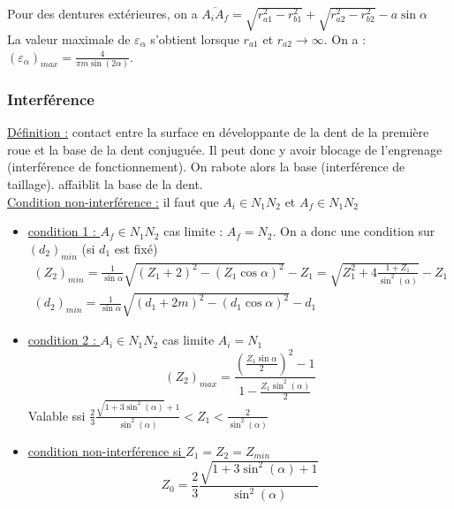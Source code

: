 \documentclass[../main.tex]{subfiles}
\begin{document}
Pour des dentures extérieures, on a $\overline{A_iA_f} = \sqrt{r_{a1}^2-r_{b1}^2}+\sqrt{r_{a2}^2-r_{b2}^2}-a\sin{\alpha}$\\

La valeur maximale de $\varepsilon_\alpha$ s'obtient lorsque $r_{a1}$ et $r_{a2}\rightarrow \infty$. On a : $(\varepsilon_\alpha)_{max} = \frac{4}{\pi m \sin(2\alpha)}$.

\subsubsection{Interférence}
\quad \underline{Définition :} contact entre la surface en développante de la dent de la première roue et la base de la dent conjuguée. Il peut donc y avoir blocage de l'engrenage (interférence de fonctionnement). On rabote alors la base (interférence de taillage). \warning affaiblit la base de la dent.\\

\quad \underline{Condition non-interférence :} il faut que $A_i \in N_1N_2$ et $A_f \in N_1N_2$\\

\begin{itemize}
    \item \underline{condition 1 : $A_f \in N_1N_2$} cas limite : $A_f=N_2$. On a donc une condition sur $(d_2)_{min}$ (si $d_1$ est fixé)\begin{equation}
    \begin{gathered}
        (Z_2)_{min} = \frac{1}{\sin{\alpha}} \sqrt{(Z_1+2)^2-(Z_1\cos{\alpha})^2}-Z_1 = \sqrt{Z_1^2+4 \frac{1+Z_1}{\sin^2(\alpha)}}-Z_1\\
        (d_2)_{min} = \frac{1}{\sin{\alpha}} \sqrt{(d_1+2m)^2-(d_1\cos{\alpha})^2}-d_1
    \end{gathered}
    \end{equation} 
    \item \underline{condition 2 : $A_i \in N_1N_2$} cas limite $A_i = N_1$\begin{equation}
        (Z_2)_{max} = \frac{(\frac{Z_1\sin{\alpha}}{2})^2-1}{1-\frac{Z_1 \sin^2(\alpha)}{2}}
    \end{equation}
    Valable ssi $\frac{2}{3}\frac{\sqrt{1+3\sin^2(\alpha)}+1}{\sin^2(\alpha)}<Z_1<\frac{2}{\sin^2(\alpha)}$\\
    \item \underline{condition non-interférence si $Z_1 = Z_2 = Z_{min}$} \begin{equation}
        Z_0 = \frac{2}{3}\frac{\sqrt{1+3\sin^2(\alpha)+1}}{\sin^2(\alpha)}
    \end{equation}
\end{itemize}
\end{document}
